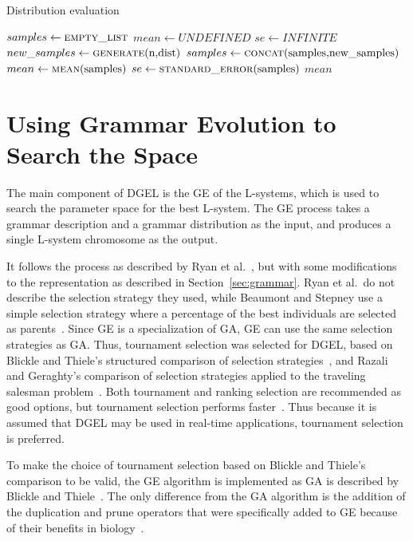 \begin{algorithm}
\caption{Distribution evaluation}
\label{alg:eval-dist}
\begin{algorithmic}
    \State $samples\gets \Call{empty\_list}{}$
    \State $mean\gets UNDEFINED$
    \State $se\gets INFINITE$
        \State $new\_samples\gets \Call{generate}{$n$, $dist$}$
        \State $samples\gets \Call{concat}{$samples$, $new\_samples$}$
        \State $mean\gets \Call{mean}{$samples$}$
        \State $se\gets \Call{standard\_error}{$samples$}$
    \EndWhile
    \State \Return $mean$
\EndFunction
\end{algorithmic}
\end{algorithm}

\section{Using Grammar Evolution to Search the Space}
The main component of \gls{DGEL} is the \gls{GE} of the \glspl{L-system}, which is used to search the parameter space for the best \gls{L-system}.
The \gls{GE} process takes a grammar description and a grammar distribution as the input, and produces a single \gls{L-system} chromosome as the output.

It follows the process as described by Ryan et al.~\cite{1998Ryan}, but with some modifications to the representation as described in Section~\ref{sec:grammar}.
Ryan et al.\ do not describe the selection strategy they used, while Beaumont and Stepney use a simple selection strategy where a percentage of the best individuals are selected as parents~\cite{2009Beaumont}.
Since \gls{GE} is a specialization of \gls{GA}, \gls{GE} can use the same selection strategies as \gls{GA}.
Thus, tournament selection was selected for \gls{DGEL}, based on Blickle and Thiele's structured comparison of selection strategies~\cite{1995Blickle}, and Razali and Geraghty's comparison of selection strategies applied to the traveling salesman problem~\cite{2011Razali}.
Both tournament and ranking selection are recommended as good options, but tournament selection performs faster~\cite{1995Blickle}.
Thus because it is assumed that \gls{DGEL} may be used in real-time applications, tournament selection is preferred.

To make the choice of tournament selection based on Blickle and Thiele's comparison to be valid, the \gls{GE} algorithm is implemented as \gls{GA} is described by Blickle and Thiele~\cite{1995Blickle}.
The only difference from the \gls{GA} algorithm is the addition of the duplication and prune operators that were specifically added to \gls{GE} because of their benefits in biology~\cite{1998Ryan}.

